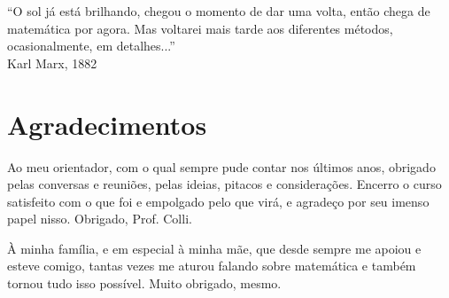 
\begin{dedicatoria}
``O sol já está brilhando, chegou o \mbox{momento} de dar uma volta, então chega de \mbox{matemática} por agora. Mas voltarei mais tarde aos \mbox{diferentes} métodos, ocasionalmente, em detalhes...''\\
Karl Marx, 1882
\end{dedicatoria}


\chapter*{Agradecimentos}

Ao meu orientador, com o qual sempre pude contar nos últimos anos, obrigado pelas conversas e reuniões, pelas ideias, pitacos e considerações. Encerro o curso satisfeito com o que foi e empolgado pelo que virá, e agradeço por seu imenso papel nisso. Obrigado, Prof. Colli.

À minha família, e em especial à minha mãe, que desde sempre me apoiou e esteve comigo, tantas vezes me aturou falando sobre matemática e também tornou tudo isso possível. Muito obrigado, mesmo.